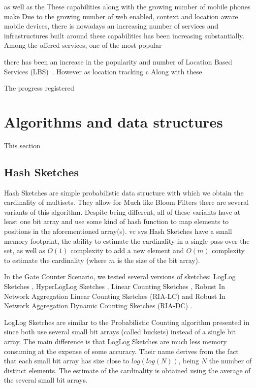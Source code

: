 as well as the 
These capabilities along with the
growing number of mobile phones make
Due to the growing number of web enabled, context and location aware mobile
devices, there is nowadays an increasing number of services and infrastructures built around these
capabilities has been increasing substantially. Among the offered
services, one of the most popular 


there has been an increase in the popularity and number of
Location Based Services (LBS)~\cite{wang2008location}. However as
location tracking c
Along with these 


 The progress registered


\section{Algorithms and data structures}
\label{sec:algorithms_and_data_structures}
This section 
\subsection{Hash Sketches}
\label{sec:hash_sketches}

Hash Sketches are simple probabilistic data structure with which we 
obtain the cardinality of multisets. They allow for 
Much like Bloom Filters there are several variants of this algorithm.
Despite being different, all of these variants have at least one bit array
and use some kind of hash function to map elements to positions in the
aforementioned array(s).
vc sys
Hash Sketches have a small memory footprint, the ability to estimate the
cardinality in a single pass over the set, as well as $O(1)$ complexity to
add a new element and $O(m)$ complexity to estimate the cardinality (where
$m$ is the size of the bit array).

In the Gate Counter Scenario, we tested several versions of sketches: LogLog
Sketches \cite{Durand:2003tc}, HyperLogLog Sketches \cite{Fusy:2007um}, Linear
Counting Sketches \cite{Whang:1990uh}, Robust In Network Aggregation Linear
Counting Sketches (RIA-LC) \cite{Fan:2008wl,YaoChungFanArbeeLPChen:2010to} and
Robust In Network Aggregation Dynamic Counting Sketches (RIA-DC)
\cite{YaoChungFanArbeeLPChen:2010to}.

LogLog Sketches are similar to the Probabilistic Counting algorithm
presented in \cite{Flajolet:1985wd} since both use several small bit arrays
(called buckets) instead of a single bit array. The main difference is that
LogLog Sketches are much less memory consuming at the expense of some
accuracy. Their name derives from the fact that each small bit array has
size close to $log(log(N))$, being $N$ the number of distinct elements. The
estimate of the cardinality is obtained using the average of the several
small bit arrays.

